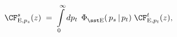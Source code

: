 \begin{equation}\label{fusionrel}
\CF_{{\rm E},p_s}^s(z)\;=\;
\int\limits_{0}^{\infty}dp_t \;\,\Phi_{\rm\sst E}^{}(\,p_s\,|\,p_t)\;
\CF_{{\rm E},p_t}^t(z),
\end{equation}

